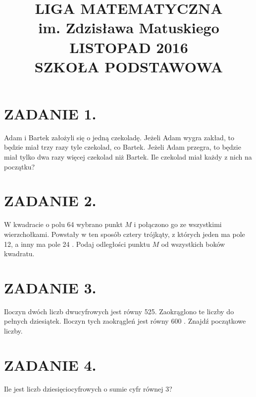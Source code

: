 \documentclass[10pt]{article}
\title{LIGA MATEMATYCZNA \\
 im. Zdzisława Matuskiego \\
 LISTOPAD 2016 \\
 SZKOŁA PODSTAWOWA }
\author{}
\date{}
\begin{document}
\maketitle
\section*{ZADANIE 1.}
Adam i Bartek założyli się o jedną czekoladę. Jeżeli Adam wygra zakład, to będzie miał trzy razy tyle czekolad, co Bartek. Jeżeli Adam przegra, to będzie miał tylko dwa razy więcej czekolad niż Bartek. Ile czekolad miał każdy z nich na początku?

\section*{ZADANIE 2.}
W kwadracie o polu 64 wybrano punkt \(M\) i połączono go ze wszystkimi wierzchołkami. Powstały w ten sposób cztery trójkąty, z których jeden ma pole 12, a inny ma pole 24 . Podaj odległości punktu \(M\) od wszystkich boków kwadratu.

\section*{ZADANIE 3.}
Iloczyn dwóch liczb dwucyfrowych jest równy 525. Zaokrąglono te liczby do pełnych dziesiątek. Iloczyn tych zaokrągleń jest równy 600 . Znajdź początkowe liczby.

\section*{ZADANIE 4.}
Ile jest liczb dziesięciocyfrowych o sumie cyfr równej 3?
\end{document}
